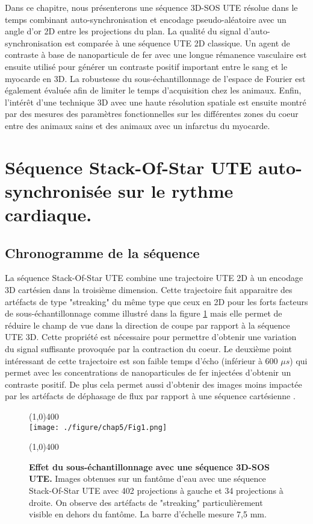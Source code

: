Dans ce chapitre, nous présenterons une séquence 3D-SOS UTE résolue dans le temps combinant auto-synchronisation et encodage pseudo-aléatoire avec un angle d'or 2D entre les projections du plan. La qualité du signal d’auto-synchronisation est comparée à une séquence UTE 2D classique. Un agent de contraste à base de nanoparticule de fer avec une longue rémanence vasculaire est ensuite utilisé pour générer un contraste positif important entre le sang et le myocarde en 3D. La robustesse du sous-échantillonnage de l’espace de Fourier est également évaluée afin de limiter le temps d’acquisition chez les animaux. Enfin, l’intérêt d'une technique 3D avec une haute résolution spatiale est ensuite montré  par des mesures des paramètres fonctionnelles sur les différentes zones du coeur entre des animaux sains et des animaux avec un infarctus du myocarde.



\section{Séquence Stack-Of-Star UTE auto-synchronisée sur le rythme cardiaque.}

\subsection{Chronogramme de la séquence}

La séquence Stack-Of-Star UTE combine une trajectoire UTE 2D à un encodage 3D cartésien dans la troisième dimension. Cette trajectoire fait apparaitre des artéfacts de type "streaking" du même type que ceux en 2D pour les forts facteurs de sous-échantillonnage comme illustré dans la figure \ref{fig:SoSUTE} mais elle permet de réduire le champ de vue dans la direction de coupe par rapport à la séquence UTE 3D. Cette propriété est nécessaire pour permettre d'obtenir une variation du signal suffisante provoquée par la contraction du coeur. Le deuxième point intéressant de cette trajectoire est son faible temps d'écho (inférieur à 600 $\mu s$) qui permet avec les concentrations de nanoparticules de fer injectées d'obtenir un contraste positif. De plus cela permet aussi d'obtenir des images moins impactée par les artéfacts de déphasage de flux par rapport à une séquence cartésienne \cite{Hoerr:2013gf}.

\begin{figure}[H]
\centering
\line(1,0){400} \\
\texttt{[image: ./figure/chap5/Fig1.png]}
\caption[Effet du sous-échantillonnage avec une séquence 3D-SOS UTE.]{\label{fig:SoSUTE} \textbf{Effet du sous-échantillonnage avec une séquence 3D-SOS UTE.} Images obtenues sur un fantôme d'eau avec une séquence Stack-Of-Star UTE avec 402 projections à gauche et 34 projections à droite. On observe des artéfacts de "streaking" particulièrement visible en dehors du fantôme. La barre d'échelle mesure 7,5 mm.}
\line(1,0){400} \\ 
\end{figure}

